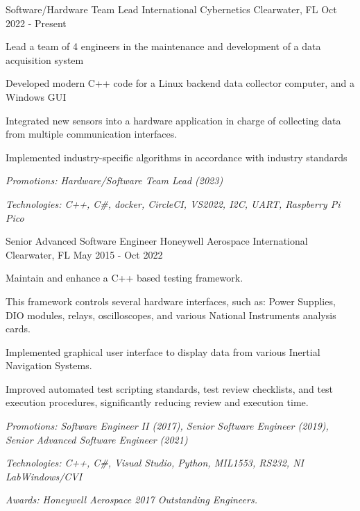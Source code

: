 

\begin{cventries}

  \cventry
    {Software/Hardware Team Lead} %
    {International Cybernetics} %
    {Clearwater, FL} %
    {Oct 2022 - Present} %
    {
      \begin{cvitems} %
        \item {Lead a team of 4 engineers in the maintenance and development of a data acquisition system}
        \item {Developed modern C++ code for a Linux backend data collector computer, and a Windows GUI}
        \item {Integrated new sensors into a hardware application in charge of collecting data from multiple communication interfaces.}
        \item {Implemented industry-specific algorithms in accordance with industry standards}
        \item {\it{Promotions:} Hardware/Software Team Lead (2023)}
      \item {\it{Technologies:} C++, C\#, docker, CircleCI, VS2022, I2C, UART, Raspberry Pi Pico}
    \end{cvitems}
    }
  \cventry
    {Senior Advanced Software Engineer} %
    {Honeywell Aerospace International} %
    {Clearwater, FL} %
    {May 2015 - Oct 2022} %
    {
      \begin{cvitems} %
        \item {Maintain and enhance a C++ based testing framework.}
				\item {This framework controls several hardware interfaces, such as: Power Supplies, DIO modules, relays, oscilloscopes, and various National Instruments analysis cards.}
        \item {Implemented graphical user interface to display data from various Inertial Navigation Systems.}
				\item {Improved automated test scripting standards, test review checklists, and test execution procedures, significantly reducing review and execution time.}
        \item {\it{Promotions:} Software Engineer II (2017), Senior Software Engineer (2019), Senior Advanced Software Engineer (2021)}
        \item {\it{Technologies:} C++, C\#, Visual Studio, Python, MIL1553, RS232, NI LabWindows/CVI}
        \item {\it {Awards:} Honeywell Aerospace 2017 Outstanding Engineers.}
      \end{cvitems}
    }


\end{cventries}
